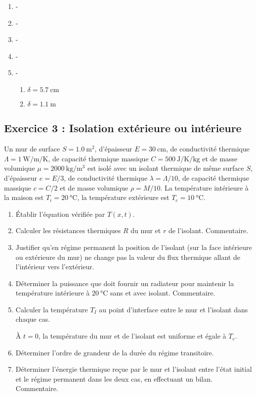 \begin{enumerate}
	\item -
	\item -
	\item -
	\item -
	\item -
	\begin{enumerate}
		\item $\delta = \SI{5.7}{\centi\meter}$
		\item $\delta = \SI{1.1}{\meter}$
	\end{enumerate}
\end{enumerate}


\subsection{Exercice 3 : Isolation extérieure ou intérieure}

Un mur de surface $S = \SI{1.0}{\meter\squared}$, d'épaisseur $E = \SI{30}{\cm}$, de conductivité thermique $\Lambda = \SI{1}{\watt\per\meter\per\kelvin}$, de capacité thermique massique $C = \SI{500}{\joule\per\kelvin\per\kilogram}$ et de masse volumique $\mu = \SI{2000}{\kg\per\cubic\meter}$ est isolé avec un isolant thermique de même surface $S$, d'épaisseur $e = E/3$, de conductivité thermique $\lambda = \Lambda/10$, de capacité thermique massique $c = C/2$ et de masse volumique $\rho = M/10$. La température intérieure à la maison est $T_i = \SI{20}{\degreeCelsius}$, la température extérieure est $T_e = \SI{10}{\degreeCelsius}$.

\begin{enumerate}
	\item Établir l'équation vérifiée par $T(x, t)$.
	\item Calculer les résistances thermiques $R$ du mur et $r$ de l'isolant. Commentaire.
	\item Justifier qu'en régime permanent la position de l'isolant (sur la face intérieure ou extérieure du mur) ne change pas la valeur du flux thermique allant de l'intérieur vers l'extérieur. 
	\item Déterminer la puissance que doit fournir un radiateur pour maintenir la température intérieure à $\SI{20}{\degreeCelsius}$ sans et avec isolant. Commentaire.
	\item Calculer la température $T_I$ au point d'interface entre le mur et l'isolant dans chaque cas.
	
	À $t=0$, la température du mur et de l'isolant est uniforme et égale à $T_e$. 
	\item Déterminer l'ordre de grandeur de la durée du régime transitoire.
	
	\item Déterminer l'énergie thermique reçue par le mur et l'isolant entre l'état initial et le régime permanent dans les deux cas, en effectuant un bilan. Commentaire.
\end{enumerate}

